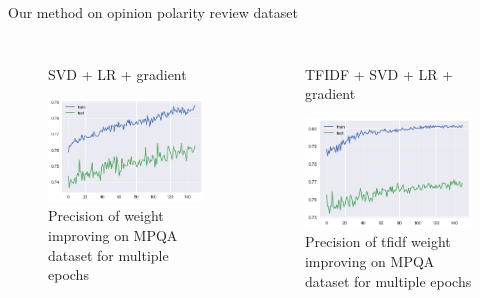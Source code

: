 \documentclass[xcolor={table}]{beamer}
\begin{document}
\begin{frame}{Our method on opinion polarity review dataset}
    \begin{columns}
            \begin{figure}[H]
                \centering
                \caption*{SVD + LR + gradient}
                \includegraphics[height=0.4\textheight]{images/MPQADataset_grad.png}
                \caption{Precision of weight improving on MPQA dataset for multiple epochs}
            \end{figure}

            \begin{figure}[H]
                \centering
                \caption*{TFIDF + SVD + LR + gradient}
                \includegraphics[height=0.4\textheight]{images/MPQADataset_tfidf_grad.png}
                \caption{Precision of tfidf weight improving on MPQA dataset for multiple epochs}
            \end{figure}
    \end{columns}                
\end{frame} 
\end{document}
